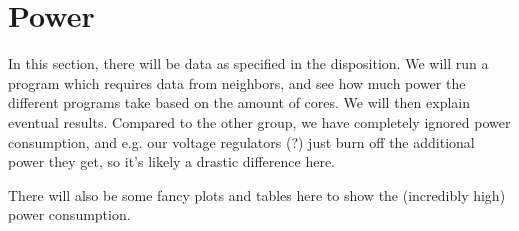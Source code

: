 \section{Power}

In this section, there will be data as specified in the disposition. We will run
a program which requires data from neighbors, and see how much power the
different programs take based on the amount of cores. We will then explain
eventual results. Compared to the other group, we have completely ignored power
consumption, and e.g. our voltage regulators (?) just burn off the additional
power they get, so it's likely a drastic difference here.

There will also be some fancy plots and tables here to show the (incredibly
high) power consumption.
